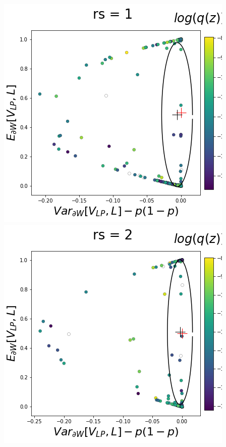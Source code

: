 \documentclass[11pt]{article}
\begin{document}
\begin{center}
\includegraphics[scale=0.33]{figs/T_x_SC_full_c=0_p=50_rs=1.png}
\includegraphics[scale=0.33]{figs/T_x_SC_full_c=0_p=50_rs=2.png}

\end{center}
\end{document}
